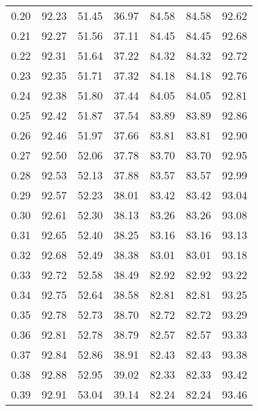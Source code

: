 \begin{tabular}{|c|c|c|c|c|c|c|}
      0.20 &     92.23 &     51.45 &      36.97 &   84.58 &      84.58 &         92.62 \\
      0.21 &     92.27 &     51.56 &      37.11 &   84.45 &      84.45 &         92.68 \\
      0.22 &     92.31 &     51.64 &      37.22 &   84.32 &      84.32 &         92.72 \\
      0.23 &     92.35 &     51.71 &      37.32 &   84.18 &      84.18 &         92.76 \\
      0.24 &     92.38 &     51.80 &      37.44 &   84.05 &      84.05 &         92.81 \\
      0.25 &     92.42 &     51.87 &      37.54 &   83.89 &      83.89 &         92.86 \\
      0.26 &     92.46 &     51.97 &      37.66 &   83.81 &      83.81 &         92.90 \\
      0.27 &     92.50 &     52.06 &      37.78 &   83.70 &      83.70 &         92.95 \\
      0.28 &     92.53 &     52.13 &      37.88 &   83.57 &      83.57 &         92.99 \\
      0.29 &     92.57 &     52.23 &      38.01 &   83.42 &      83.42 &         93.04 \\
      0.30 &     92.61 &     52.30 &      38.13 &   83.26 &      83.26 &         93.08 \\
      0.31 &     92.65 &     52.40 &      38.25 &   83.16 &      83.16 &         93.13 \\
      0.32 &     92.68 &     52.49 &      38.38 &   83.01 &      83.01 &         93.18 \\
      0.33 &     92.72 &     52.58 &      38.49 &   82.92 &      82.92 &         93.22 \\
      0.34 &     92.75 &     52.64 &      38.58 &   82.81 &      82.81 &         93.25 \\
      0.35 &     92.78 &     52.73 &      38.70 &   82.72 &      82.72 &         93.29 \\
      0.36 &     92.81 &     52.78 &      38.79 &   82.57 &      82.57 &         93.33 \\
      0.37 &     92.84 &     52.86 &      38.91 &   82.43 &      82.43 &         93.38 \\
      0.38 &     92.88 &     52.95 &      39.02 &   82.33 &      82.33 &         93.42 \\
      0.39 &     92.91 &     53.04 &      39.14 &   82.24 &      82.24 &         93.46 \\

\end{tabular}
